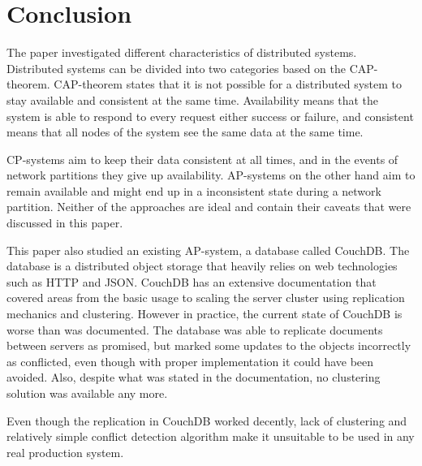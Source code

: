 \section{Conclusion}

The paper investigated different characteristics of distributed systems.
Distributed systems can be divided into two categories based on the
CAP-theorem. CAP-theorem states that it is not possible for a distributed system
to stay available and consistent at the same time. Availability means that the
system is able to respond to every request either success or failure, and
consistent means that all nodes of the system see the same data at the same
time.

CP-systems aim to keep their data consistent at all times, and in the events of
network partitions they give up availability. AP-systems on the other hand aim
to remain available and might end up in a inconsistent state during a network
partition. Neither of the approaches are ideal and contain their caveats that
were discussed in this paper.

This paper also studied an existing AP-system, a database called CouchDB\@. The
database is a distributed object storage that heavily relies on web technologies
such as HTTP and JSON\@. CouchDB has an extensive documentation that covered
areas from the basic usage to scaling the server cluster using replication
mechanics and clustering. However in practice, the current state of CouchDB is
worse than was documented. The database was able to replicate documents between
servers as promised, but marked some updates to the objects incorrectly as
conflicted, even though with proper implementation it could have been avoided.
Also, despite what was stated in the documentation, no clustering solution was
available any more.

Even though the replication in CouchDB worked decently, lack of clustering and
relatively simple conflict detection algorithm make it unsuitable to be used in
any real production system.
